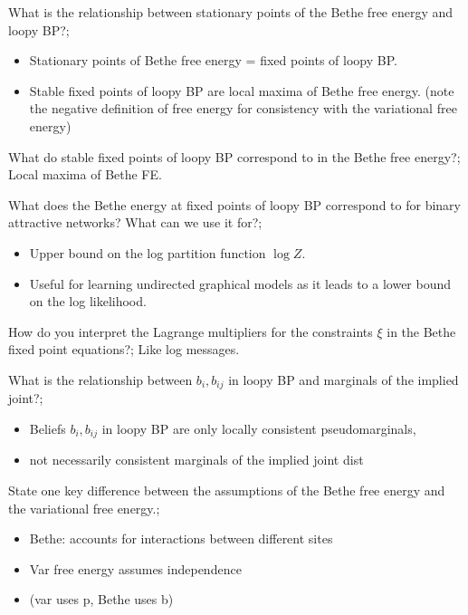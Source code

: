 \documentclass{article}
\begin{document}
What is the relationship between stationary points of the Bethe free energy and loopy BP?; \begin{itemize}
    \item Stationary points of Bethe free energy = fixed points of loopy BP.
    \item Stable fixed points of loopy BP are local maxima of Bethe free energy. (note the negative definition of free energy for consistency with the variational free energy)
\end{itemize}

What do stable fixed points of loopy BP correspond to in the Bethe free energy?; Local maxima of Bethe FE.

What does the Bethe energy at fixed points of loopy BP correspond to for binary attractive networks? What can we use it for?; \begin{itemize}
    \item Upper bound on the log partition function $\log Z$.
    \item Useful for learning undirected graphical models as it leads to a lower bound on the log likelihood.
\end{itemize}

How do you interpret the Lagrange multipliers for the constraints $\xi$ in the Bethe fixed point equations?; Like log messages.

What is the relationship between $b_i, b_{ij}$ in loopy BP and marginals of the implied joint?; \begin{itemize}
    \item Beliefs $b_i, b_{ij}$ in loopy BP are only locally consistent pseudomarginals, \item not necessarily consistent marginals of the implied joint dist
\end{itemize}

State one key difference between the assumptions of the Bethe free energy and the variational free energy.; \begin{itemize}
    \item Bethe: accounts for interactions between different sites
    \item Var free energy assumes independence
    \item (var uses p, Bethe uses b)
\end{itemize}
\end{document}
